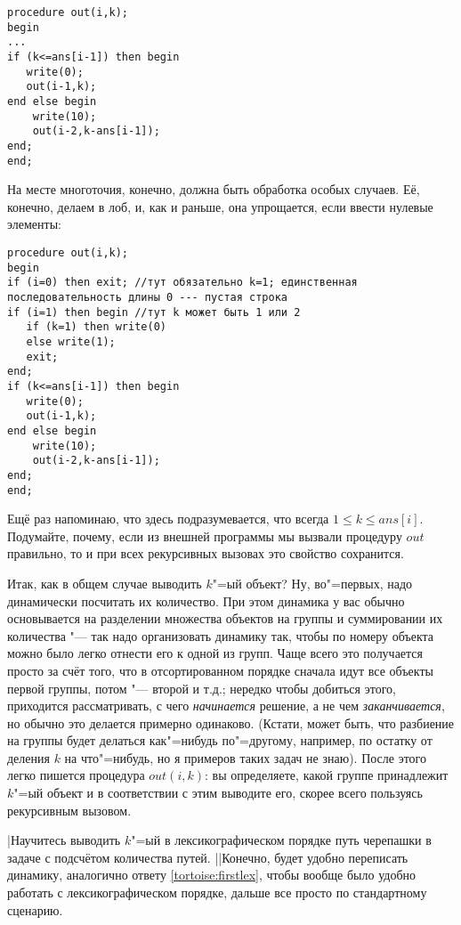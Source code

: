 \begin{codesampleo}\begin{verbatim}
procedure out(i,k);
begin
...
if (k<=ans[i-1]) then begin
   write(0);
   out(i-1,k);
end else begin
    write(10);
    out(i-2,k-ans[i-1]);
end;
end;
\end{verbatim}
\end{codesampleo}

На месте многоточия, конечно, должна быть обработка особых случаев. Её, конечно, делаем в лоб,
и, как и раньше, она упрощается, если ввести нулевые элементы:

\begin{codesampleo}\begin{verbatim}
procedure out(i,k);
begin
if (i=0) then exit; //тут обязательно k=1; единственная последовательность длины 0 --- пустая строка
if (i=1) then begin //тут k может быть 1 или 2
   if (k=1) then write(0)
   else write(1);
   exit;
end;
if (k<=ans[i-1]) then begin
   write(0);
   out(i-1,k);
end else begin
    write(10);
    out(i-2,k-ans[i-1]);
end;
end;
\end{verbatim}
\end{codesampleo}
Ещё раз напоминаю, что здесь подразумевается, что всегда $1\leq k\leq ans[i]$. Подумайте,
почему, если из внешней программы мы вызвали процедуру $out$ правильно, то и при всех 
рекурсивных вызовах это свойство сохранится.

Итак, как в общем случае выводить $k$"=ый объект? Ну, во"=первых, надо динамически посчитать 
их количество. При этом динамика у вас обычно основывается на разделении множества объектов на группы и суммировании их количества "--- так надо организовать динамику так, чтобы по номеру
объекта можно было легко отнести его к одной из групп. Чаще всего это получается просто за счёт того, что в отсортированном порядке сначала идут все объекты первой группы, потом "--- второй
и т.д.; нередко чтобы добиться этого, приходится рассматривать, с чего \textit{начинается}
решение, а не чем \textit{заканчивается}, но обычно это делается примерно одинаково.
(Кстати, может быть, что разбиение на группы будет делаться как"=нибудь по"=другому,
например, по остатку от деления $k$ на что"=нибудь, но я примеров таких задач не знаю).
После этого легко пишется процедура $out(i,k)$: вы определяете, какой группе принадлежит
$k$"=ый объект и в соответствии с этим выводите его, скорее всего пользуясь рекурсивным вызовом.

\task|Научитесь выводить $k$"=ый в лексикографическом порядке путь черепашки в задаче с подсчётом 
количества путей.
||Конечно, будет удобно переписать динамику, аналогично ответу \ref{tortoise:firstlex}, 
чтобы вообще было удобно работать с лексикографическом порядке, дальше все просто по стандартному 
сценарию.


